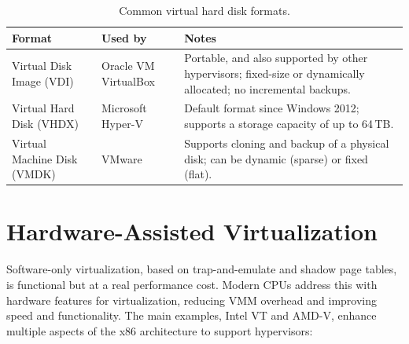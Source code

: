 \begin{table}[H]
    \small
    \centering
    \renewcommand{\arraystretch}{1.1}
    \begin{tabular}{p{}|p{}p{}}
        \textbf{Format} & \textbf{Used by} & \textbf{Notes} \\
        \hline
        Virtual Disk Image (VDI) & Oracle VM VirtualBox & Portable, and also supported by other hypervisors; fixed-size or dynamically allocated; no incremental backups. \\
        Virtual Hard Disk (VHDX) & Microsoft Hyper-V & Default format since Windows 2012; supports a storage capacity of up to 64\,TB. \\
        Virtual Machine Disk (VMDK) & VMware & Supports cloning and backup of a physical disk; can be dynamic (sparse) or fixed (flat). \\
    \end{tabular}

    \caption{Common virtual hard disk formats.}
    \label{tab:disk-formats}

    \vspace{-1em}

\end{table}

\section{Hardware-Assisted Virtualization} \label{sec:hw_assisted_virtualization}

Software-only virtualization, based on trap-and-emulate and shadow page tables, is functional but at a real performance cost. Modern CPUs address this with hardware features for virtualization, reducing VMM overhead and improving speed and functionality. The main examples, Intel VT and AMD-V, enhance multiple aspects of the x86 architecture to support hypervisors:

\smallskip

